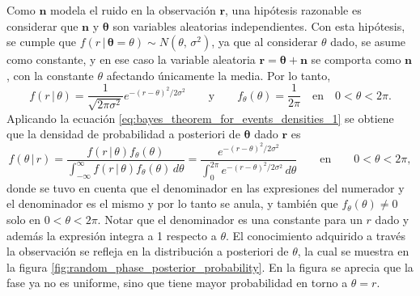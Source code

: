 \documentclass[a4paper]{report}
\begin{document}
Como \(\mathbf{n}\) modela el ruido en la observación \(\mathbf{r}\), una hipótesis razonable es considerar que \(\mathbf{n}\) y \(\pmb{\theta}\) son variables aleatorias independientes. Con esta hipótesis, se cumple que \(f(r\,|\,\pmb{\theta}=\theta)\sim N(\theta,\,\sigma^2)\), ya que al considerar \(\theta\) dado, se asume como constante, y en ese caso la variable aleatoria \(\mathbf{r}=\pmb{\theta}+\mathbf{n}\) se comporta como \(\mathbf{n}\), con la constante \(\theta\) afectando únicamente la media. Por lo tanto,
\[
 f(r\,|\,\theta)=\frac{1}{\sqrt{2\pi\sigma^2}}e^{-(r-\theta)^2/2\sigma^2}\qquad\textrm{y}\qquad f_{\theta}(\theta)=\frac{1}{2\pi}\quad\textrm{en}\quad 0<\theta<2\pi.
\]
Aplicando la ecuación \ref{eq:bayes_theorem_for_events_densities_1} se obtiene que la densidad de probabilidad a posteriori de \(\pmb{\theta}\) dado \(\mathbf{r}\) es
\[
 f(\theta\,|\,r)=\frac{f(r\,|\,\theta)f_{\theta}(\theta)}{\int_{-\infty}^{\infty}f(r\,|\,\theta)f_{\theta}(\theta)\,d\theta}=\frac{e^{-(r-\theta)^2/2\sigma^2}}{\int_{0}^{2\pi}e^{-(r-\theta)^2/2\sigma^2}\,d\theta}\qquad\textrm{en}\qquad 0<\theta<2\pi,
\]
donde se tuvo en cuenta que el denominador en las expresiones del numerador y el denominador es el mismo y por lo tanto se anula, y también que \(f_{\theta}(\theta)\neq0\) solo en  \(0<\theta<2\pi\).
Notar que el denominador es una constante para un \(r\) dado y además la expresión integra a 1 respecto a \(\theta\). El conocimiento adquirido a través la observación se refleja en la distribución a posteriori de \(\theta\), la cual se muestra en la figura \ref{fig:random_phase_posterior_probability}. En la figura se aprecia que la fase ya no es uniforme, sino que tiene mayor probabilidad en torno a \(\theta=r\).
\end{document}
